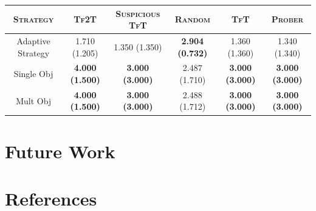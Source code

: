 \documentclass[a4paper]{article}
\begin{document}
	\renewcommand{\tabcolsep}{6pt}

	\begin{table}[H]
	  \begin{center}
	  	\footnotesize
	    \begin{tabular}{|c|c|c|c|c|c|}
	      \toprule
	 	  \textsc{Strategy} & \textsc{Tf2T} & {\footnotesize{\textsc{Suspicious TfT}}} & \textsc{Random} & \textsc{TfT} & \textsc{Prober}\\
		  \midrule
		  Adaptive Strategy & 1.710 {(1.205)} & 1.350 (1.350) & \textbf{2.904 (0.732)} & 1.360 (1.360) & 1.340 (1.340)\\
		  Single Obj & \textbf{4.000} \textbf{(1.500)} & \textbf{3.000 (3.000)} & 2.487 (1.710) & \textbf{3.000 (3.000)} & \textbf{3.000 (3.000)}\\
		  Mult Obj & \textbf{4.000} \textbf{(1.500)} & \textbf{3.000 (3.000)} & 2.488 (1.712) & \textbf{3.000 (3.000)} & \textbf{3.000 (3.000)}\\
		  \bottomrule
	    \end{tabular}
	  \end{center}
	\end{table}  		

	\section{Future Work}
			
	\section{References}
\end{document}
